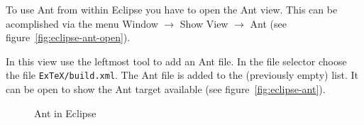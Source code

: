 \documentclass{extex-doc}
\newcommand\menu{\textsf}
\newcommand\sub{\(\rightarrow\) }
\newcommand\File[1]{\texttt{#1}}
\begin{document}
To use Ant from within Eclipse you have to open the Ant view. This can
be acomplished via the menu \menu{Window \sub Show View \sub Ant} (see
figure~\ref{fig:eclipse-ant-open}).

In this view use the leftmost tool to add an Ant file. In the file
selector choose the file \File{ExTeX/build.xml}. The Ant file is added
to the (previously empty) list. It can be open to show the Ant target
available (see figure~\ref{fig:eclipse-ant}).
\begin{figure}[htp]
  \hbox{}\hfill
  \hfill
  \caption{Ant in Eclipse}
\end{figure}
\end{document}
